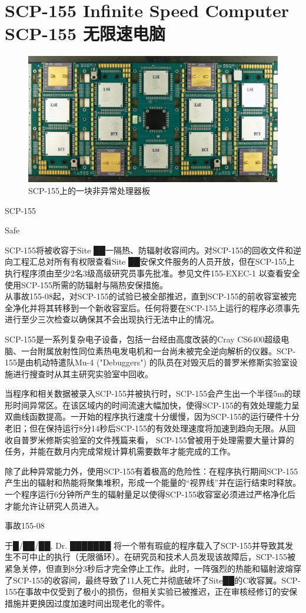 \chapter[SCP-155 无限速电脑]{
    SCP-155 Infinite Speed Computer \\
    SCP-155 无限速电脑
}

\label{chap:SCP-155}

\begin{figure}[H]
    \centering
    \includegraphics[width=0.5\linewidth]{images/SCP.155.jpg}
    \caption*{SCP-155上的一块非异常处理器板}
\end{figure}

SCP-155

Safe

SCP-155将被收容于Site ██一隔热、防辐射收容间内。对SCP-155的回收文件和逆向工程汇总对所有有权限查看Site ██安保文件服务的人员开放，但在SCP-155上执行程序须由至少2名3级高级研究员事先批准。参见文件155-EXEC-1 以查看安全使用SCP-155所需的防辐射与隔热安保措施。\\
从事故155-08起，对SCP-155的试验已被全部推迟，直到SCP-155的前收容室被完全净化并将其转移到一个新收容室后。任何将要在SCP-155上运行的程序必须事先进行至少三次检查以确保其不会出现执行无法中止的情况。

SCP-155是一系列复杂电子设备，包括一台经由高度改装的Cray CS6400超级电脑、一台附属放射性同位素热电发电机和一台尚未被完全逆向解析的仪器。SCP-155是由机动特遣队Mu-4 ("Debuggers") 的队员在对毁灭后的普罗米修斯实验室设施进行搜查时从其主研究实验室中回收。

当程序和相关数据被录入SCP-155并被执行时，SCP-155会产生出一个半径5m的球形时间异常区。在该区域内的时间流速大幅加快，使得SCP-155的有效处理能力呈双曲线函数提高。一开始的程序执行速度十分缓慢，因为SCP-155的运行硬件十分老旧；但在保持运行8分14秒后SCP-155的有效处理速度将加速到趋向无限。从回收自普罗米修斯实验室的文件残篇来看， SCP-155曾被用于处理需要大量计算的任务，并能在数月内完成常规计算机需要数年才能完成的工作。

除了此种异常能力外，使用SCP-155有着极高的危险性：在程序执行期间SCP-155产生出的辐射和热能将聚集堆积，形成一个能量的“视界线”并在运行结束时释放。一个程序运行6分钟所产生的辐射量足以使得SCP-155收容室必须进过严格净化后才能允许让研究人员进入。

事故155-08

于█\slash ██\slash ██, Dr. ███████ 将一个带有瑕疵的程序载入了SCP-155并导致其发生不可中止的执行（无限循环）。在研究员和技术人员发现该故障后，SCP-155被紧急关停，但直到8分3秒后才完全停止工作。此时，一阵强烈的热能和辐射波熔穿了SCP-155的收容间，最终导致了11人死亡并彻底破坏了Site██的C收容翼。SCP-155在事故中仅受到了极小的损伤，但相关实验已被推迟，正在审核经修订的安保措施并更换因过度加速时间出现老化的零件。
